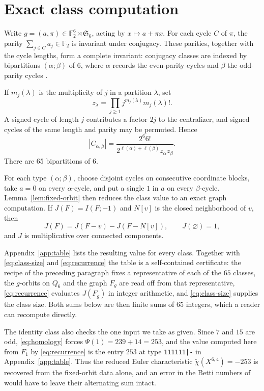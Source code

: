 \documentclass[11pt]{amsart}
\newcommand{\F}{\mathbb F}
\newcommand{\stype}[1]{\texttt{#1}}
\begin{document}
\section{Exact class computation}

Write $g=(a,\pi)\in\F_2^6\rtimes\mathfrak S_6$, acting by
$x\mapsto a+\pi x$. For each cycle $C$ of $\pi$, the parity
$\sum_{j\in C}a_j\in\F_2$ is invariant under conjugacy. These parities,
together with the cycle lengths, form a complete invariant: conjugacy classes
are indexed by bipartitions $(\alpha;\beta)$ of $6$, where $\alpha$ records
the even-parity cycles and $\beta$ the odd-parity cycles
\cite[Section~5.2]{GMW}.

If $m_j(\lambda)$ is the multiplicity of $j$ in a partition $\lambda$, set
\[
z_\lambda=\prod_{j\ge1}j^{m_j(\lambda)}m_j(\lambda)!.
\]
A signed cycle of length $j$ contributes a factor $2j$ to the centralizer,
and signed cycles of the same length and parity may be permuted. Hence
\begin{equation}\label{eq:class-size}
|C_{\alpha,\beta}|=
\frac{2^6 6!}{2^{\ell(\alpha)+\ell(\beta)}z_\alpha z_\beta}.
\end{equation}
There are $65$ bipartitions of $6$.

For each type $(\alpha;\beta)$, choose disjoint cycles on consecutive
coordinate blocks, take $a=0$ on every $\alpha$-cycle, and put a single $1$
in $a$ on every $\beta$-cycle. Lemma~\ref{lem:fixed-orbit} then reduces the
class value to an exact graph computation. If $J(F)=I(F;-1)$ and $N[v]$ is
the closed neighborhood of $v$, then
\begin{equation}\label{eq:recurrence}
J(F)=J(F-v)-J(F-N[v]),\qquad J(\varnothing)=1,
\end{equation}
and $J$ is multiplicative over connected components.

Appendix~\ref{app:table} lists the resulting value for every class. Together
with \eqref{eq:class-size} and \eqref{eq:recurrence} the table is a
self-contained certificate: the recipe of the preceding paragraph fixes a
representative of each of the $65$ classes, the $g$-orbits on $Q_6$ and the
graph $F_g$ are read off from that representative, \eqref{eq:recurrence}
evaluates $J(F_g)$ in integer arithmetic, and \eqref{eq:class-size} supplies
the class size. Both sums below are then finite sums of $65$ integers, which a
reader can recompute directly.

The identity class also checks the one input we take as given. Since $7$ and
$15$ are odd, \eqref{eq:homology} forces $\Psi(1)=239+14=253$, and the value
computed here from $F_1$ by \eqref{eq:recurrence} is the entry $253$ at type
\stype{111111|-} in Appendix~\ref{app:table}. Thus the reduced Euler
characteristic $\widetilde\chi(X^{6,4})=-253$ is recovered from the
fixed-orbit data alone, and an error in the Betti numbers of
\cite[Appendix~C.3]{GMW} would have to leave their alternating sum intact.
\end{document}
